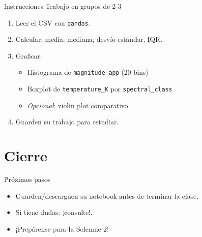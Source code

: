 \documentclass[10pt]{beamer}
\begin{document}
\begin{frame}{Instrucciones}
Trabajo en grupos de 2-3  
\begin{enumerate}
  \item Leer el CSV con \texttt{pandas}.
  \item Calcular: media, mediana, desvío estándar, IQR.
  \item Graficar:
        \begin{itemize}
          \item Histograma de \texttt{magnitude\_app} (20 bins)
          \item Boxplot de \texttt{temperature\_K} por \texttt{spectral\_class}
          \item \emph{Opcional}: violin plot comparativo
        \end{itemize}
  \item Guarden su trabajo para estudiar.
\end{enumerate}
\end{frame}



\section{Cierre}
\begin{frame}{Próximos pasos}
\begin{itemize}
  \item Guarden/descarguen su notebook antes de terminar la clase.
  \item Si tiene dudas: ¡consulte!.
  \item ¡Prepárense para la Solemne 2!
\end{itemize}
\end{frame}
\end{document}
